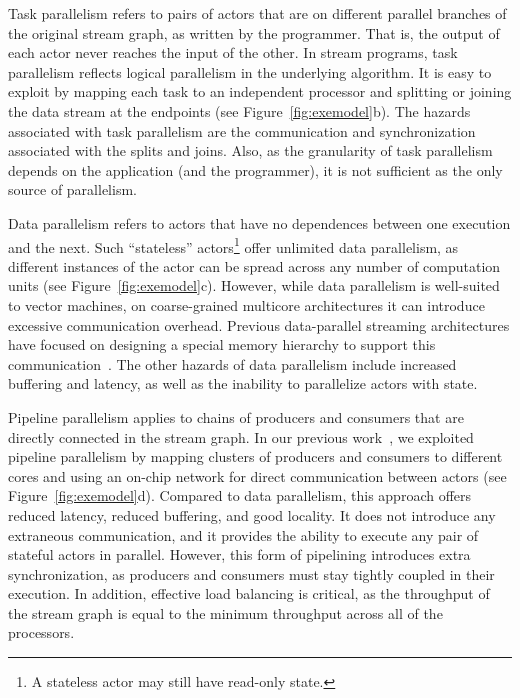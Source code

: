 Task parallelism refers to pairs of actors that are on different
parallel branches of the original stream graph, as written by the
programmer.  That is, the output of each actor never reaches the input
of the other.  In stream programs, task parallelism reflects logical
parallelism in the underlying algorithm.  It is easy to exploit by
mapping each task to an independent processor and splitting or joining
the data stream at the endpoints (see Figure~\ref{fig:exemodel}b).
The hazards associated with task parallelism are the communication and
synchronization associated with the splits and joins.  Also, as the
granularity of task parallelism depends on the application (and the
programmer), it is not sufficient as the only source of parallelism.

Data parallelism refers to actors that have no dependences between one
execution and the next.  Such ``stateless'' actors\footnote{A
stateless actor may still have read-only state.}  offer unlimited data
parallelism, as different instances of the actor can be spread across
any number of computation units (see Figure~\ref{fig:exemodel}c).
However, while data parallelism is well-suited to vector machines, on
coarse-grained multicore architectures it can introduce excessive
communication overhead.  Previous data-parallel streaming
architectures have focused on designing a special memory hierarchy to
support this communication~\cite{imagine-ieee}.  The other hazards of data
parallelism include increased buffering and latency, as well as the
inability to parallelize actors with state.

Pipeline parallelism applies to chains of producers and consumers that
are directly connected in the stream graph.  In our previous
work~\cite{streamit-asplos}, we exploited pipeline parallelism by
mapping clusters of producers and consumers to different cores and
using an on-chip network for direct communication between actors (see
Figure~\ref{fig:exemodel}d).  Compared to data parallelism, this
approach offers reduced latency, reduced buffering, and good locality.
It does not introduce any extraneous communication, and it provides
the ability to execute any pair of stateful actors in parallel.
However, this form of pipelining introduces extra synchronization, as
producers and consumers must stay tightly coupled in their execution.
In addition, effective load balancing is critical, as the throughput
of the stream graph is equal to the minimum throughput across all of
the processors.

